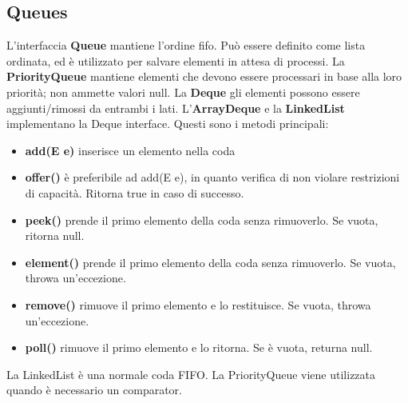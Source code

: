 \documentclass[11pt]{article}
\begin{document}
\subsection{Queues}
L'interfaccia \textbf{Queue} mantiene l'ordine \gls{fifo}. Può essere definito come lista ordinata, ed è utilizzato per salvare elementi in attesa di processi. La \textbf{PriorityQueue} mantiene elementi che devono essere processari in base alla loro priorità; non ammette valori null. La \textbf{Deque} gli elementi possono essere aggiunti/rimossi da entrambi i lati. L'\textbf{ArrayDeque} e la \textbf{LinkedList} implementano la Deque interface. Questi sono i metodi principali:
\begin{itemize}
    \item \textbf{add(E e)} inserisce un elemento nella coda 
    \item \textbf{offer()} è preferibile ad add(E e), in quanto verifica di non violare restrizioni di capacità. Ritorna true in caso di successo.
    \item \textbf{peek()} prende il primo elemento della coda senza rimuoverlo. Se vuota, ritorna null.
    \item \textbf{element()} prende il primo elemento della coda senza rimuoverlo. Se vuota, throwa un'eccezione.
    \item \textbf{remove()} rimuove il primo elemento e lo restituisce. Se vuota, throwa un'eccezione.
    \item \textbf{poll()} rimuove il primo elemento e lo ritorna. Se è vuota, returna null.
\end{itemize}
La LinkedList è una normale coda FIFO. La PriorityQueue viene utilizzata quando è necessario un comparator.
\end{document}

